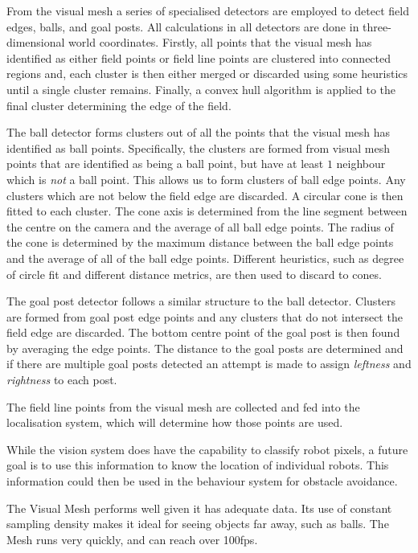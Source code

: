 \documentclass{llncs}
\begin{document}
From the visual mesh a series of specialised detectors are employed to detect field edges, balls, and goal posts. All calculations in all detectors are done in three-dimensional world coordinates. Firstly, all points that the visual mesh has identified as either field points or field line points are clustered into connected regions and, each cluster is then either merged or discarded using some heuristics until a single cluster remains. Finally, a convex hull algorithm is applied to the final cluster determining the edge of the field.

The ball detector forms clusters out of all the points that the visual mesh has identified as ball points. Specifically, the clusters are formed from visual mesh points that are identified as being a ball point, but have at least $1$ neighbour which is \emph{not} a ball point. This allows us to form clusters of ball edge points. Any clusters which are not below the field edge are discarded. A circular cone is then fitted to each cluster. The cone axis is determined from the line segment between the centre on the camera and the average of all ball edge points. The radius of the cone is determined by the maximum distance between the ball edge points and the average of all of the ball edge points. Different heuristics, such as degree of circle fit and different distance metrics, are then used to discard to cones.

The goal post detector follows a similar structure to the ball detector. Clusters are formed from goal post edge points and any clusters that do not intersect the field edge are discarded. The bottom centre point of the goal post is then found by averaging the edge points. The distance to the goal posts are determined and if there are multiple goal posts detected an attempt is made to assign \emph{leftness} and \emph{rightness} to each post.

The field line points from the visual mesh are collected and fed into the localisation system, which will determine how those points are used.

While the vision system does have the capability to classify robot pixels, a future goal is to use this information to know the location of individual robots. This information could then be used in the behaviour system for obstacle avoidance.

The Visual Mesh performs well given it has adequate data. Its use of constant sampling density makes it ideal for seeing objects far away, such as balls. The Mesh runs very quickly, and can reach over 100fps. 
\end{document}
